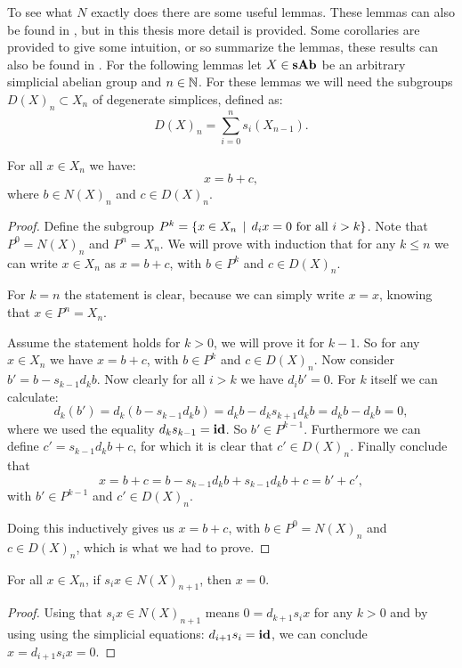 To see what $N$ exactly does there are some useful lemmas. These lemmas can also be found in \cite[Chapter~VIII~1-2]{lamotke}, but in this thesis more detail is provided. Some corollaries are provided to give some intuition, or so summarize the lemmas, these results can also be found in \cite[Chapter~8.2-4]{weibel}. For the following lemmas let $X \in \mathbf{sAb}$ be an arbitrary simplicial abelian group and $n \in \mathbb{N}$. For these lemmas we will need the subgroups $D(X)_n \subset X_n$ of degenerate simplices, defined as:
$$ D(X)_n = \sum_{i=0}^n s_i(X_{n-1}). $$

\begin{lemma}
	\label{le:decomp1}
	For all $x \in X_n$ we have:
	$$ x = b + c,$$
	where $b \in N(X)_n$ and $c \in D(X)_n$.
\end{lemma}
\begin{proof}
	Define the subgroup $P^k = \{ x \in X_n \,\mid\, d_i x = 0 \text{ for all } i > k\}$. Note that $P^0 = N(X)_n$ and $P^n = X_n$. We will prove with induction that for any $k \leq n$ we can write $x \in X_n$ as $x = b + c$, with $b \in P^k$ and $c \in D(X)_n$.

	For $k = n$ the statement is clear, because we can simply write $x = x$, knowing that $x \in P^n = X_n$.

	Assume the statement holds for $k > 0$, we will prove it for $k-1$. So for any $x \in X_n$ we have $x = b + c$, with $b \in P^k$ and $c \in D(X)_n$. Now consider $b' = b - s_{k-1} d_k b$. Now clearly for all $i > k$ we have $d_i b' = 0$. For $k$ itself we can calculate:
	$$ d_k(b') = d_k(b - s_{k-1} d_k b) = d_k b - d_k s_{k+1} d_k b = d_k b - d_k b = 0, $$
	where we used the equality $d_k s_{k-1} = \mathbf{id}$. So $b' \in P^{k-1}$. Furthermore we can define $c' = s_{k-1} d_k b + c$, for which it is clear that $c' \in D(X)_n$. Finally conclude that
	$$ x = b + c = b - s_{k-1} d_k b + s_{k-1} d_k b + c = b' + c',$$
	with $b' \in P^{k-1}$ and $c' \in D(X)_n$.

	Doing this inductively gives us $x = b + c$, with $b \in P^0 = N(X)_n$ and $c \in D(X)_n$, which is what we had to prove.
\end{proof}
\begin{lemma}
	\label{le:decomp2}
	For all $x \in X_n$, if $s_i x \in N(X)_{n+1}$, then $x = 0$.
\end{lemma}
\begin{proof}
	Using that $s_i x \in N(X)_{n+1}$ means $0 = d_{k+1} s_i x$ for any $k > 0$ and by using using the simplicial equations: $d_{i+1} s_i = \mathbf{id}$, we can conclude $x = d_{i+1} s_i x = 0$.
\end{proof}

